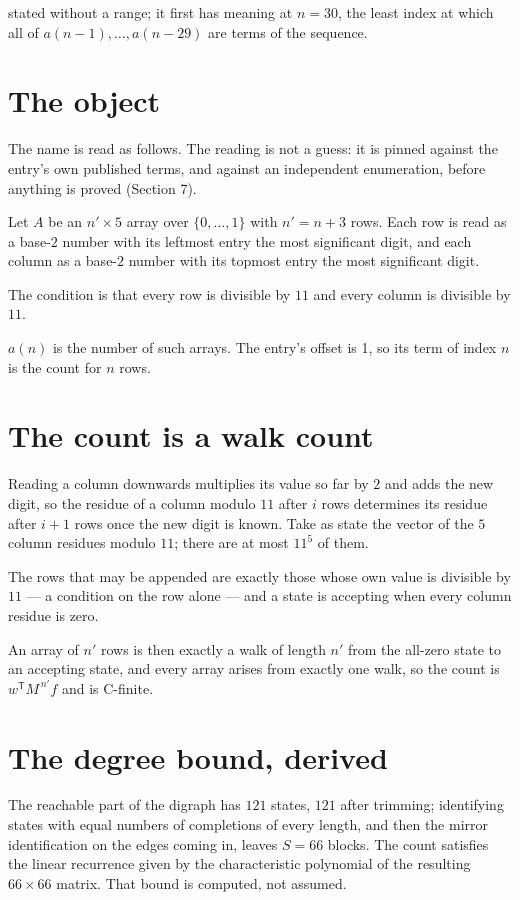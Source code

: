 \documentclass[11pt]{article}
\theoremstyle{definition}
\begin{document}
stated without a range; it first has meaning at $n = 30$, the least index at which all of $a(n-1),\dots,a(n-29)$ are terms of the sequence.

\section{The object}

The name is read as follows. The reading is not a guess: it is pinned against the entry's own published terms, and against an independent enumeration, before anything is proved (Section 7).

Let $A$ be an $n' \times 5$ array over $\{0,\dots,1\}$ with $n' = n + 3$ rows. Each row is read as a base-$2$ number with its leftmost entry the most significant digit, and each column as a base-$2$ number with its topmost entry the most significant digit.

The condition is that every row is divisible by $11$ and every column is divisible by $11$.

$a(n)$ is the number of such arrays. The entry's offset is 1, so its term of index $n$ is the count for $n$ rows.

\section{The count is a walk count}

Reading a column downwards multiplies its value so far by $2$ and adds the new digit, so the residue of a column modulo $11$ after $i$ rows determines its residue after $i+1$ rows once the new digit is known. Take as state the vector of the $5$ column residues modulo $11$; there are at most $11^{5}$ of them.

The rows that may be appended are exactly those whose own value is divisible by $11$ --- a condition on the row alone --- and a state is accepting when every column residue is zero.

An array of $n'$ rows is then exactly a walk of length $n'$ from the all-zero state to an accepting state, and every array arises from exactly one walk, so the count is $w^{\mathsf T}M^{\,n'}f$ and is C-finite.

\section{The degree bound, derived}

The reachable part of the digraph has $121$ states, $121$ after trimming; identifying states with equal numbers of completions of every length, and then the mirror identification on the edges coming in, leaves $S = 66$ blocks. The count satisfies the linear recurrence given by the characteristic polynomial of the resulting $66\times66$ matrix. That bound is computed, not assumed.
\end{document}
